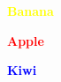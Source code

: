 \documentclass{article}
\newcommand{\kw}[2][red]{\textcolor{#1}{\textbf{#2}}}
\begin{document}

	\kw[yellow]{Banana}

	\kw{Apple}

	\kw[blue]{Kiwi}
	
\end{document}
